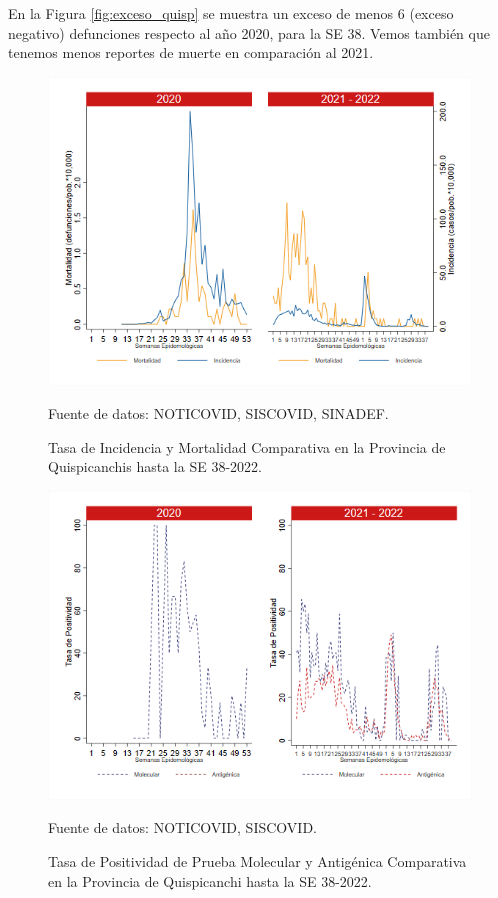 \documentclass[12pt,a4paper,openany]{book}
\begin{document}
	En la Figura \ref{fig:exceso_quisp} se muestra un exceso de menos 6 (exceso negativo) defunciones respecto al año 2020, para la SE 38. Vemos también que tenemos menos reportes de muerte en comparación al 2021. 
	
	\begin{figure}[h]
		\caption{Tasa de Incidencia y Mortalidad Comparativa en la Provincia de Quispicanchis hasta la SE 38-2022.}\label{fig:inc_mort_quisp}
		\begin{center}
			\includegraphics[width=0.85\linewidth]{../figuras/incidencia_mortalidad_20_21_12.png}
		\end{center}
		{\footnotesize {Fuente de datos: NOTICOVID, SISCOVID, SINADEF.}}
	\end{figure}
	
	\begin{figure}[h]
		\caption{Tasa de Positividad de Prueba Molecular y Antigénica Comparativa en la Provincia de Quispicanchi hasta la SE 38-2022.}\label{fig:positividad_quisp}
		\begin{center}
			\includegraphics[width=0.7\linewidth]{../figuras/positividad_20_21_12.png}
		\end{center}
		{\footnotesize {Fuente de datos: NOTICOVID, SISCOVID.}}
	\end{figure}
	
\end{document}
